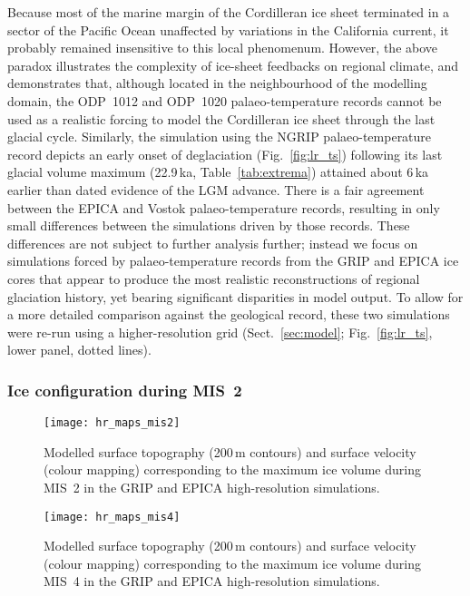 \documentclass[tc, manuscript]{copernicus}
\begin{document}
Because most of the marine margin of the Cordilleran ice sheet terminated in a
sector of the Pacific Ocean unaffected by variations in the California current,
it probably remained insensitive to this local phenomenum. However, the above
paradox
illustrates the complexity of ice-sheet feedbacks on regional climate, and
demonstrates that, although located in the neighbourhood of the modelling
domain, the ODP~1012 and ODP~1020 palaeo-temperature records cannot be
used as a realistic forcing to model the Cordilleran ice sheet
through the last glacial cycle.
Similarly, the simulation using the NGRIP palaeo-temperature record depicts an
early onset of deglaciation (Fig.~\ref{fig:lr_ts}) following its last
glacial volume maximum (22.9\,ka, Table~\ref{tab:extrema}) attained about 6\,ka
earlier than dated evidence of the LGM advance.
There is a fair agreement between the EPICA and Vostok
palaeo-temperature records, resulting in only small differences between the
simulations driven by those records. These differences are not subject to
further analysis further; instead we focus on simulations forced by
palaeo-temperature records from the GRIP and EPICA ice cores that appear to
produce the most realistic reconstructions of regional glaciation history, yet
bearing significant disparities in model output. To
allow for a more detailed comparison against the geological record, these two
simulations were re-run using a higher-resolution grid (Sect.~\ref{sec:model};
Fig.~\ref{fig:lr_ts}, lower panel, dotted lines).


\subsubsection{Ice configuration during MIS~2}
\label{sec:mis2}

\begin{figure*}
  \texttt{[image: hr\_maps\_mis2]}
  \caption{Modelled surface topography (200\,m contours) and surface velocity
           (colour mapping) corresponding to the maximum ice volume during
           MIS~2 in the GRIP and EPICA high-resolution simulations.}
  \label{fig:mis2}
\end{figure*}

\begin{figure*}
  \texttt{[image: hr\_maps\_mis4]}
  \caption{Modelled surface topography (200\,m contours) and surface velocity
           (colour mapping) corresponding to the maximum ice volume during
           MIS~4 in the GRIP and EPICA high-resolution simulations.}
  \label{fig:mis4}
\end{figure*}
\end{document}
